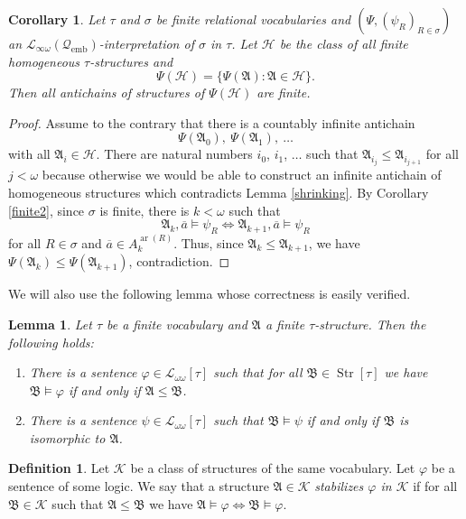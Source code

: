 \documentclass{ndjflart}
\theoremstyle{plain}
\newtheorem{lemma}[conjecture]{Lemma}
\newtheorem{corollary}[conjecture]{Corollary}
\theoremstyle{definition}
\newtheorem{definition}[conjecture]{Definition}
\numberwithin{equation}{section}
\DeclareMathOperator{\emb}{emb}
\DeclareMathOperator{\Str}{Str}
\DeclareMathOperator{\ar}{ar}
\begin{document}
\begin{corollary}\label{shrinking_interpr}
Let $\tau$ and $\sigma$ be finite relational vocabularies and
$(\Psi, (\psi_R)_{R \in \sigma})$ an 
$\mathcal{L}_{\infty \omega}(\mathcal{Q}_{\emb})$-interpretation of $\sigma$ in
$\tau$.
Let $\mathcal{H}$ be the class of all finite homogeneous $\tau$-structures and
\[
	\Psi(\mathcal{H}) = \{\Psi(\mathfrak{A}) \colon \mathfrak{A} \in \mathcal{H}\}.
\]
Then all antichains of structures of $\Psi(\mathcal{H})$ are finite.
\end{corollary}
\begin{proof}
Assume to the contrary that there is a countably infinite antichain
\[
	\Psi(\mathfrak{A}_0),\ \Psi(\mathfrak{A}_1),\ \dots
\]
with all $\mathfrak{A}_i \in \mathcal{H}$.
There are natural numbers $i_0$, $i_1$, $\dots$ such that 
$\mathfrak{A}_{i_j} \leq \mathfrak{A}_{i_{j + 1}}$ for all $j < \omega$
because otherwise we would be able to construct an infinite antichain of 
homogeneous structures which contradicts Lemma \ref{shrinking}.
By Corollary \ref{finite2}, since $\sigma$ is finite, there is $k < \omega$
such that 
\[
	\mathfrak{A}_k, \overline{a} \vDash \psi_R \Leftrightarrow
	\mathfrak{A}_{k + 1}, \overline{a} \vDash \psi_R
\]
for all $R \in \sigma$ and $\overline{a} \in A_k^{\ar(R)}$.
Thus, since $\mathfrak{A}_k \leq \mathfrak{A}_{k + 1}$, we have
$\Psi(\mathfrak{A}_k) \leq \Psi(\mathfrak{A}_{k + 1})$, contradiction.
\end{proof}

We will also use the following lemma whose correctness is easily verified.

\begin{lemma}\label{substr}
Let $\tau$ be a finite vocabulary and $\mathfrak{A}$ a finite $\tau$-structure.
Then the following holds:
\begin{enumerate}
\item There is a sentence $\varphi \in \mathcal{L}_{\omega\omega}[\tau]$ such
that for all $\mathfrak{B}\in \Str[\tau]$ we have
$\mathfrak{B} \vDash \varphi$ if and only if $\mathfrak{A} \leq \mathfrak{B}$.
\item There is a sentence $\psi \in \mathcal{L}_{\omega\omega}[\tau]$ such that
$\mathfrak{B} \vDash \psi$ if and only if $\mathfrak{B}$ is isomorphic to
$\mathfrak{A}$.
\end{enumerate}
\end{lemma}

\begin{definition}
Let $\mathcal{K}$ be a class of structures of the same vocabulary.
Let $\varphi$ be a sentence of some logic.
We say that a structure $\mathfrak{A}\in\mathcal{K}$
\emph{stabilizes $\varphi$ in $\mathcal{K}$} if for all
$\mathfrak{B} \in \mathcal{K}$ such that $\mathfrak{A}\leq\mathfrak{B}$ we have
$\mathfrak{A} \vDash \varphi \Leftrightarrow \mathfrak{B} \vDash \varphi$.
\end{definition}
\end{document}
